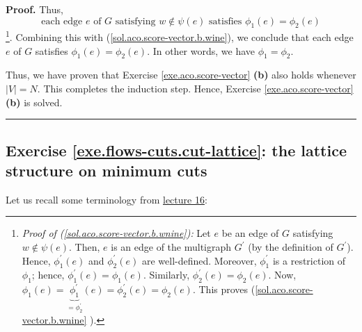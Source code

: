 \documentclass[numbers=enddot,12pt,final,onecolumn,notitlepage]{scrartcl}%
\theoremstyle{definition}
\newenvironment{proof}[1][Proof]{\noindent\textbf{#1.} }{\ \rule{0.5em}{0.5em}}
\begin{document}
\begin{proof}
Thus,%
\begin{equation}
\text{each edge }e\text{ of }G\text{ satisfying }w\notin\psi\left(  e\right)
\text{ satisfies }\phi_{1}\left(  e\right)  =\phi_{2}\left(  e\right)
\label{sol.aco.score-vector.b.wnine}%
\end{equation}
\footnote{\textit{Proof of (\ref{sol.aco.score-vector.b.wnine}):} Let $e$ be
an edge of $G$ satisfying $w\notin\psi\left(  e\right)  $. Then, $e$ is an
edge of the multigraph $G^{\prime}$ (by the definition of $G^{\prime}$).
Hence, $\phi_{1}^{\prime}\left(  e\right)  $ and $\phi_{2}^{\prime}\left(
e\right)  $ are well-defined. Moreover, $\phi_{1}^{\prime}$ is a restriction
of $\phi_{1}$; hence, $\phi_{1}^{\prime}\left(  e\right)  =\phi_{1}\left(
e\right)  $. Similarly, $\phi_{2}^{\prime}\left(  e\right)  =\phi_{2}\left(
e\right)  $. Now, $\phi_{1}\left(  e\right)  =\underbrace{\phi_{1}^{\prime}%
}_{=\phi_{2}^{\prime}}\left(  e\right)  =\phi_{2}^{\prime}\left(  e\right)
=\phi_{2}\left(  e\right)  $. This proves (\ref{sol.aco.score-vector.b.wnine}%
).}. Combining this with (\ref{sol.aco.score-vector.b.wine}), we conclude that
each edge $e$ of $G$ satisfies $\phi_{1}\left(  e\right)  =\phi_{2}\left(
e\right)  $. In other words, we have $\phi_{1}=\phi_{2}$.

Thus, we have proven that Exercise \ref{exe.aco.score-vector} \textbf{(b)}
also holds whenever $\left\vert V\right\vert =N$. This completes the induction
step. Hence, Exercise \ref{exe.aco.score-vector} \textbf{(b)} is solved.
\end{proof}

\subsection{Exercise \ref{exe.flows-cuts.cut-lattice}: the
lattice structure on minimum cuts}

Let us recall some terminology from
\href{http://www-users.math.umn.edu/~dgrinber/5707s17/5707lec16.pdf}{lecture 16}:
\end{document}
